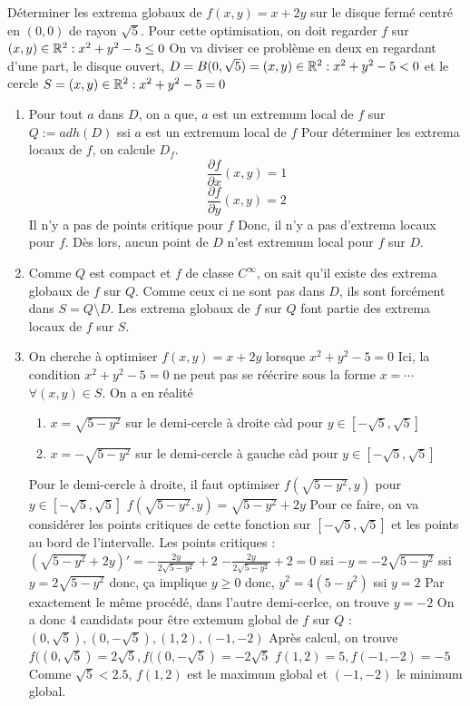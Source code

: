 \begin{exemple}
    Déterminer les extrema globaux de $f(x,y) = x + 2y$ sur le disque fermé centré en $(0,0)$ de rayon $\sqrt5$.
    Pour cette optimisation, on doit regarder $f$ sur ${(x,y) \in \mathbb{R}^2 : x^2 + y^2 - 5 \le 0}$
    On va diviser ce problème en deux en regardant d'une part, le disque ouvert,
    $D = B(0,\sqrt5) = {(x,y) \in \mathbb{R}^2 : x^2 + y^2 - 5 < 0}$ et le cercle 
    $S = {(x,y) \in \mathbb{R}^2 : x^2 + y^2 - 5 = 0}$
    \begin{enumerate}
        \item Pour tout $a$ dans $D$, on a que,
        $a$ est un extremum local de $f$ sur $Q := adh(D)$ ssi $a$ est un extremum local de $f$
        Pour déterminer les extrema locaux de $f$, on calcule $D_f$.
        $$ \frac{\partial f}{\partial x}(x,y) = 1 $$
        $$ \frac{\partial f}{\partial y}(x,y) =  2 $$
        Il n'y a pas de points critique pour $f$ Donc, il n'y a pas d'extrema locaux pour $f$.
        Dès lors, aucun point de $D$ n'est extremum local pour $f$ sur $D$.
        \item Comme $Q$ est compact et $f$ de classe $C^\infty$, on sait qu'il existe des extrema globaux de $f$ sur $Q$.
        Comme ceux ci ne sont pas dans $D$, ils sont forcément dans $S = Q \setminus D$.
        Les extrema globaux de $f$ sur $Q$ font partie des extrema locaux de $f$ sur $S$.
        \item On cherche à optimiser $f(x,y) = x + 2y$ lorsque $x^2 + y^2 - 5 = 0$
        Ici, la condition $x^2 + y^2 - 5 = 0$ ne peut pas se réécrire sous la forme
        $x = \cdots$ $\forall (x,y) \in S $.
        On a en réalité
        \begin{enumerate}
            \item $x = \sqrt{5-y^2}$ sur le demi-cercle à droite 
            càd pour $y \in [-\sqrt5, \sqrt5]$
            \item $x = -\sqrt{5-y^2}$ sur le demi-cercle à gauche
            càd pour $y \in [-\sqrt5, \sqrt5]$
        \end{enumerate}
        Pour le demi-cercle à droite, il faut optimiser $f(\sqrt{5-y^2},y)$ pour $y \in [-\sqrt5, \sqrt5]$
        $f(\sqrt{5-y^2},y) = \sqrt{5-y^2} + 2y$
        Pour ce faire, on va considérer les points critiques de cette fonction sur $[-\sqrt5, \sqrt5]$ et les points au bord de l’intervalle.
        Les points critiques : $(\sqrt{5-y^2} + 2y)' = -\frac{2y}{2\sqrt{5-y^2}} + 2$
        $-\frac{2y}{2\sqrt{5-y^2}} + 2 = 0 $ ssi $ -y = -2\sqrt{5-y^2}$ ssi $y = 2\sqrt{5-y^2}$ donc, ça implique $y \ge 0$ donc, $y^2 = 4(5-y^2)$ ssi $y = 2$
        Par exactement le même procédé, dans l'autre demi-cerlce, on trouve $y = -2$
        On a donc $4$ candidats pour être extemum global de $f$ sur $Q$ : 
        $(0,\sqrt5),(0,-\sqrt5),(1,2),(-1,-2)$
        Après calcul, on trouve $f((0,\sqrt5) = 2\sqrt5, f((0,-\sqrt5) = -2\sqrt5$ 
        $f(1,2) = 5, f(-1,-2) = -5$
        Comme $\sqrt5 < 2.5$, $f(1,2)$ est le maximum global et $(-1,-2)$ le minimum global.
    \end{enumerate}
\end{exemple}
